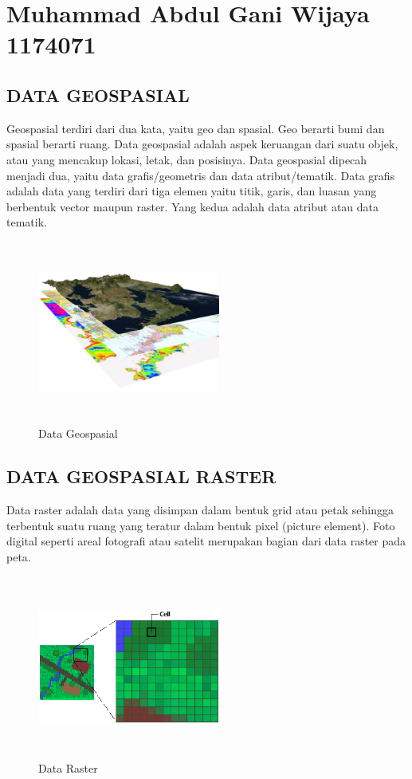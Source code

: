 \section{Muhammad Abdul Gani Wijaya 1174071}
\subsection{DATA GEOSPASIAL} 
Geospasial terdiri dari dua kata, yaitu geo dan spasial. Geo berarti bumi dan spasial berarti ruang. Data geospasial adalah aspek keruangan dari suatu objek, atau yang mencakup lokasi, letak, dan posisinya. Data geospasial dipecah menjadi dua, yaitu data grafis/geometris dan data atribut/tematik. Data grafis adalah data yang terdiri dari tiga elemen yaitu titik, garis, dan luasan yang berbentuk vector maupun raster. Yang kedua adalah data atribut atau data tematik.
\begin{figure}[!htbp]
\centering
\includegraphics[width=6cm,height=6cm]{figures/Tugas1/1174071/Geospasial.jpg}
\caption{Data Geospasial}
\end{figure}	
\subsection{DATA GEOSPASIAL RASTER}
Data raster adalah data yang disimpan dalam bentuk grid atau petak sehingga terbentuk suatu ruang yang teratur dalam bentuk pixel (picture element). Foto digital seperti areal fotografi atau satelit merupakan bagian dari data raster pada peta.
\begin{figure}[!htbp]
\centering
\includegraphics[width=6cm,height=6cm]{figures/Tugas1/1174071/Raster.png}
\caption{Data Raster}
\end{figure}	
